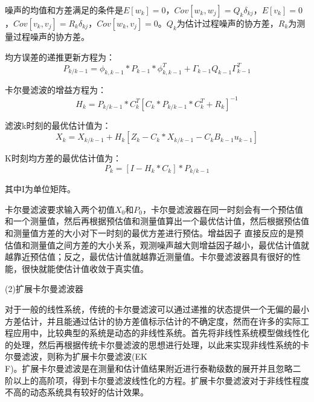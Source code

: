 噪声的均值和方差满足的条件是$E\left[ {{w}_{k}} \right]=0$，$Cov\left[ {{w}_{k}},{{w}_{j}} \right]={{Q}_{k}}{{\delta }_{kj}}$，$E\left[ {{v}_{k}} \right]=0$，$Cov\left[ {{v}_{k}},{{v}_{j}} \right]={{R}_{k}}{{\delta }_{kj}}$，$Cov\left[ {{w}_{k}},{{v}_{j}} \right]=0$。${{Q}_{k}}$为估计过程噪声的协方差，${{R}_{k}}$为测量过程噪声的协方差。


均方误差的递推更新方程为：
\begin{equation}
{{P}_{k/k-1}}={{\phi }_{k,k-1}}*{{P}_{k-1}}*\phi _{k,k-1}^{T}+{{\Gamma }_{k-1}}{{Q}_{k-1}}\Gamma _{k-1}^{T}
\end{equation}

卡尔曼滤波的增益方程为：
\begin{equation}
{{H}_{k}}={{P}_{k/k-1}}*C_{k}^{T}{{\left[ {{C}_{k}}*{{P}_{k/k-1}}*C_{k}^{T}+{{R}_{k}} \right]}^{-1}}
\end{equation}

滤波k时刻的最优估计值为：
\begin{equation}
{{X}_{k}}={{X}_{k/k-1}}+{{H}_{k}}\left[ {{Z}_{k}}-{{C}_{k}}*{{X}_{k/k-1}}-{{C}_{k}}{{B}_{k-1}}{{u}_{k-1}} \right]
\end{equation}

K时刻均方差的最优估计值为：
\begin{equation}
{{P}_{k}}=\left[ I-{{H}_{k}}*{{C}_{k}} \right]*{{P}_{k/k-1}}
\end{equation}

其中I为单位矩阵。

卡尔曼滤波要求输入两个初值${{X}_{0}}$和${{P}_{0}}$，卡尔曼滤波器在同一时刻会有一个预估值和一个测量值，然后再根据预估值和测量值算出一个最优估计值，然后根据预估值和测量值方差的大小对下一时刻的最优方差进行预估。增益因子 直接反应的是预估值和测量值之间方差的大小关系，观测噪声越大则增益因子越小，最优估计值就越靠近预估值；反之，最优估计值就越靠近测量值。卡尔曼滤波器具有很好的性能，很快就能使估计值收敛于真实值。

(2)扩展卡尔曼滤波器

对于一般的线性系统，传统的卡尔曼滤波可以通过递推的状态提供一个无偏的最小方差估计，并且能通过估计的协方差值标示估计的不确定度，然而在许多的实际工程应用中，比较典型的系统是动态的非线性系统。首先将非线性系统模型做线性化的处理，然后再根据传统卡尔曼滤波的思想进行处理，以此来实现非线性系统的卡尔曼滤波，则称为扩展卡尔曼滤波(EK\\F)。扩展卡尔曼滤波是在测量和估计值结果附近进行泰勒级数的展开并且忽略二阶以上的高阶项，得到卡尔曼滤波线性化的方程。扩展卡尔曼滤波对于非线性程度不高的动态系统具有较好的估计效果。

